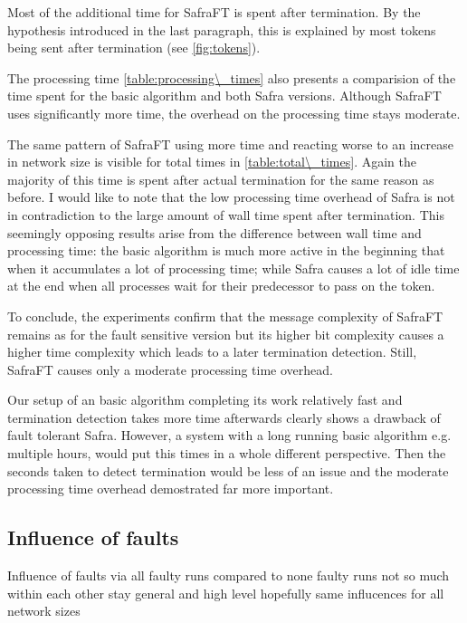 Most of the additional time for SafraFT is spent after termination.
By the hypothesis introduced in the last paragraph, this is explained by most tokens being sent after termination (see \cref{fig:tokens}).

The processing time \cref{table:processing\_times} also presents a comparision of the time spent for the basic algorithm and both Safra versions.
Although SafraFT uses significantly more time, the overhead on the processing time stays moderate.

The same pattern of SafraFT using more time and reacting worse to an increase in network size is visible for total times in \cref{table:total\_times}.
Again the majority of this time is spent after actual termination for the same reason as before.
I would like to note that the low processing time overhead of Safra is not in contradiction to the large amount of wall time spent after termination.
This seemingly opposing results arise from the difference between wall time and processing time: the basic algorithm is much more active in the beginning that when it accumulates a lot of processing time; while Safra causes a lot of idle time at the end when all processes wait for their predecessor to pass on the token.

To conclude, the experiments confirm that the message complexity of SafraFT remains as for the fault sensitive version but its higher bit complexity causes a higher time complexity which leads to a later termination detection. 
Still, SafraFT causes only a moderate processing time overhead.

Our setup of an basic algorithm completing its work relatively fast and termination detection takes more time afterwards clearly shows a drawback of fault tolerant Safra.
However, a system with a long running basic algorithm e.g. multiple hours, would put this times in a whole different perspective.
Then the seconds taken to detect termination would be less of an issue and the moderate processing time overhead demostrated far more important.


\subsection{Influence of faults}

Influence of faults via all faulty runs compared to none faulty runs not so much within each other
stay general and high level
hopefully same influcences for all network sizes


